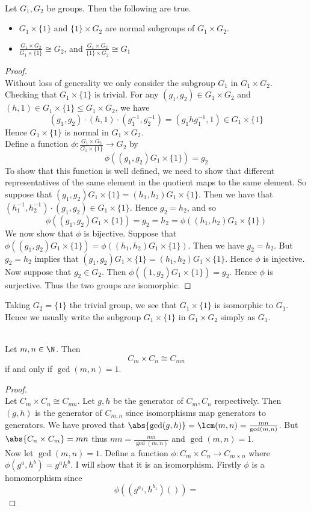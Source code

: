 \documentclass[a4paper]{article}
\begin{document}
\begin{prp}{}{}\\
Let $G_1,G_2$ be groups. Then the following are true. 
\begin{itemize}
\item $G_1\times\{1\}$ and $\{1\}\times G_2$ are normal subgroups of $G_1\times G_2$. 
\item $\frac{G_1\times G_2}{G_1\times\{1\}}\cong G_2$, and $\frac{G_1\times G_2}{\{1\}\times G_2}\cong G_1$
\end{itemize}
\begin{proof}\\
Without loss of generality we only consider the subgroup $G_1$ in $G_1\times G_2$. Checking that $G_1\times\{1\}$ is trivial. For any $(g_1,g_2)\in G_1\times G_2$ and $(h,1)\in G_1\times\{1\}\leq G_1\times G_2$, we have $$(g_1,g_2)\cdot(h,1)\cdot(g_1^{-1},g_2^{-1})=(g_1hg_1^{-1},1)\in G_1\times\{1\}$$ Hence $G_1\times\{1\}$ is normal in $G_1\times G_2$. \\

Define a function $\phi:\frac{G_1\times G_2}{G_1\times\{1\}}\to G_2$ by $$\phi((g_1,g_2)G_1\times\{1\})=g_2$$ To show that this function is well defined, we need to show that different representatives of the same element in the quotient maps to the same element. So suppose that $(g_1,g_2)G_1\times\{1\}=(h_1,h_2)G_1\times\{1\}$. Then we have that $(h_1^{-1},h_2^{-1})\cdot(g_1,g_2)\in G_1\times\{1\}$. Hence $g_2=h_2$, and so $$\phi((g_1,g_2)G_1\times\{1\})=g_2=h_2=\phi((h_1,h_2)G_1\times\{1\})$$ We now show that $\phi$ is bijective. Suppose that $\phi((g_1,g_2)G_1\times\{1\})=\phi((h_1,h_2)G_1\times\{1\})$. Then we have $g_2=h_2$. But $g_2=h_2$ implies that $(g_1,g_2)G_1\times\{1\}=(h_1,h_2)G_1\times\{1\}$. Hence $\phi$ is injective. Now suppose that $g_2\in G_2$. Then $\phi((1,g_2)G_1\times\{1\})=g_2$. Hence $\phi$ is surjective. Thus the two groups are isomorphic. 
\end{proof}
\end{prp}

Taking $G_2=\{1\}$ the trivial group, we see that $G_1\times\{1\}$ is isomorphic to $G_1$. Hence we usually write the subgroup $G_1\times\{1\}$ in $G_1\times G_2$ simply as $G_1$. 

\begin{prp}{}{}\\
Let $m,n\in\N$. Then $$C_m\times C_n\cong C_{mn}$$ if and only if $\gcd(m,n)=1$. 
\begin{proof}\\
Let $C_m\times C_n\cong C_{mn}$. Let $g,h$ be the generator of $C_m,C_n$ respectively. Then $(g,h)$ is the generator of $C_{m,n}$ since isomorphisms map generators to generators. We have proved that $\abs{\gcd(g,h)}=\lcm(m,n)=\frac{mn}{\gcd(m,n)}$. But $\abs{C_n\times C_m}=mn$ thus $mn=\frac{mn}{\gcd(m,n)}$ and $\gcd(m,n)=1$. \\
Now let $\gcd(m,n)=1$. Define a function $\phi:C_m\times C_n\to C_{m\times n}$ where $\phi(g^a,h^b)=g^ah^b$. I will show that it is an isomorphism. Firstly $\phi$ is a homomorphism since $$\phi((g^{a_1},h^{b_1})())=$$
\end{proof}
\end{prp}
\end{document}
